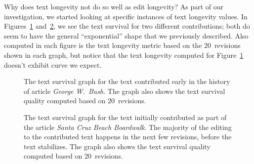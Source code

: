 Why does text longevity not do so well as edit longevity?
As part of our investigation, we started looking at specific
instances of text longevity values.
In Figures~\ref{fig:ts-GeorgeWBush} and~\ref{fig:ts-SantaCruzBeachBoardwalk},
we see the text survival for two different contributions;
both do seem to have the general ``exponential'' shape
that we previously described.
Also computed in each figure is the text longevity metric based on
the 20~revisions shown in each graph, but notice that the text
longevity computed for
Figure~\ref{fig:ts-GeorgeWBush} doesn't exhibit curve we expect.

\begin{figure}[tbph]
\centering
{}
\caption{The text survival graph for the text contributed early
        in the history of article \textit{George W.~Bush}.
	The graph also shows the text survival quality
	computed based on 20~revisions.
	}
\label{fig:ts-GeorgeWBush}
\end{figure}

\begin{figure}[tbph]
\centering
{}
\caption{The text survival graph for the text initially contributed
	as part of the article \textit{Santa Cruz Beach Boardwalk}.
	The majority of the editing to the contributed text happens
	in the next few revisions, before the text stabilizes.
	The graph also shows the text survival quality
	computed based on 20~revisions.
	}
\label{fig:ts-SantaCruzBeachBoardwalk}
\end{figure}


